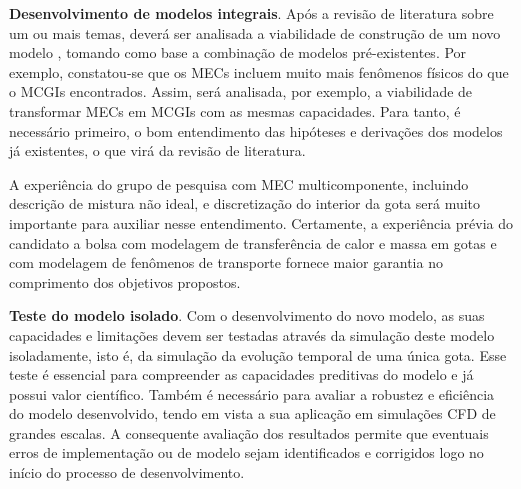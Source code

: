 \textbf{Desenvolvimento de modelos integrais}.
Após a revisão de literatura sobre um ou mais temas, deverá ser analisada a viabilidade de construção de um novo modelo , tomando como base a combinação de modelos  pré-existentes.
Por exemplo, constatou-se que os MECs incluem muito mais fenômenos físicos do que o MCGIs encontrados. 
Assim, será analisada, por exemplo, a viabilidade de transformar MECs em MCGIs com as mesmas capacidades.
Para tanto, é necessário primeiro, o bom entendimento das hipóteses e derivações dos modelos já existentes, o que virá da revisão de literatura.   

A experiência do grupo de pesquisa com MEC multicomponente, incluindo descrição de mistura não ideal, e discretização do interior da gota será muito importante para auxiliar nesse entendimento.
Certamente, a experiência prévia do candidato a bolsa com modelagem de transferência de calor e massa em gotas \cite{HenningsJ2024MT} e com modelagem de fenômenos de transporte \cite{HenningsJ2023BT,DokozaT2024,DokozaT2025,DeBroeckL2025} fornece maior garantia no comprimento dos objetivos propostos. %

\textbf{Teste do modelo isolado}.
Com o desenvolvimento do novo modelo, as suas capacidades e limitações devem ser testadas através da simulação deste modelo isoladamente, isto é, da simulação da evolução temporal de uma única gota.
Esse teste é essencial para compreender as capacidades preditivas do modelo e já possui valor científico. Também é necessário para avaliar a robustez e eficiência do modelo desenvolvido, tendo em vista a sua aplicação em simulações CFD de grandes escalas.
A consequente avaliação dos resultados permite que eventuais erros de implementação ou de modelo sejam identificados e corrigidos logo no início do processo de desenvolvimento.


